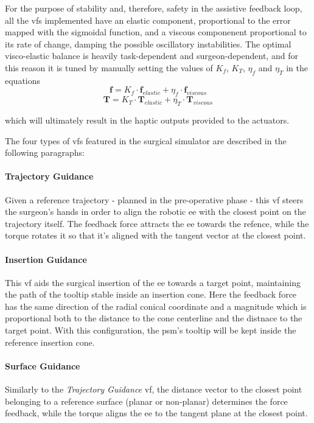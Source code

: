 \documentclass{article}
\newcommand{\vect}[1]{\textbf{#1}}
\begin{document}
\begin{multicols}{2}
For the purpose of stability and, therefore, safety in the assistive feedback loop, all the \acp{vf} implemented have an elastic component, proportional to the error mapped with the sigmoidal function, and a viscous componenent proportional to its rate of change, damping the possible oscillatory instabilities. The optimal visco-elastic balance is heavily task-dependent and surgeon-dependent, and for this reason it is tuned by manually setting the values of $K_f$, $K_T$, $\eta_f$ and $\eta_T$ in the equations
\begin{equation}
  \vect{f} = K_f\cdot\vect{f}_{elastic} + \eta_f\cdot\vect{f}_{viscous} 
  \label{eq:forcevfbalance}
\end{equation}
\begin{equation}
  \vect{T} = K_T\cdot\vect{T}_{elastic} + \eta_T\cdot\vect{T}_{viscous} 
  \label{eq:torquevfbalance}
\end{equation}    

which will ultimately result in the haptic outputs provided to the actuators.

The four types of \acp{vf} featured in the surgical simulator are described in the following paragraphs:
\paragraph{Trajectory Guidance} Given a reference trajectory - planned in the pre-operative phase - this \ac{vf} steers the surgeon's hands in order to align the robotic \ac{ee} with the closest point on the trajectory itself. The feedback force attracts the \ac{ee} towards the refence, while the torque rotates it so that it's aligned with the tangent vector at the closest point. 
\paragraph{Insertion Guidance} This \ac{vf} aids the surgical insertion of the \ac{ee} towards a target point, maintaining the path of the tooltip stable inside an insertion cone. Here the feedback force has the same direction of the radial conical coordinate and a magnitude which is proportional both to the distance to the cone centerline and the distnace to the target point. With this configuration, the \ac{psm}'s tooltip will be kept inside the reference insertion cone.
\paragraph{Surface Guidance} Similarly to the \textit{Trajectory Guidance} \ac{vf}, the distance vector to the closest point belonging to a reference surface (planar or non-planar) determines the force feedback, while the torque aligns the \ac{ee} to the tangent plane at the closest point.

\end{multicols}
\end{document}

